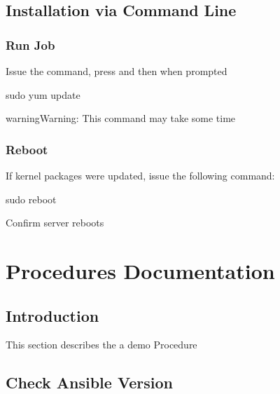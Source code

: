 \documentclass[letterpaper,10pt,english]{sphinxmanual}
\begin{document}
\section{Installation via Command Line}
\label{\detokenize{legacy/legacy-install:installation-via-command-line}}

\subsection{Run Job}
\label{\detokenize{legacy/legacy-install:run-job}}
\sphinxAtStartPar
Issue the command, press  and then \sphinxcode{\sphinxupquote{{[}ENTER{]}}} when prompted

\begin{sphinxVerbatim}[commandchars=\\\{\}]
sudo yum update
\end{sphinxVerbatim}

\begin{sphinxadmonition}{warning}{Warning:}
\sphinxAtStartPar
This command may take some time
\end{sphinxadmonition}


\subsection{Reboot}
\label{\detokenize{legacy/legacy-install:reboot}}
\sphinxAtStartPar
If kernel packages were updated, issue the following command:

\begin{sphinxVerbatim}[commandchars=\\\{\}]
sudo reboot
\end{sphinxVerbatim}

\sphinxAtStartPar
{} Confirm server reboots


\chapter{Procedures Documentation}
\label{\detokenize{procedures:procedures-documentation}}\label{\detokenize{procedures::doc}}

\section{Introduction}
\label{\detokenize{procedures:introduction}}
\sphinxAtStartPar
This section describes the a demo Procedure


\section{Check Ansible Version}
\label{\detokenize{procedures:check-ansible-version}}
\end{document}
